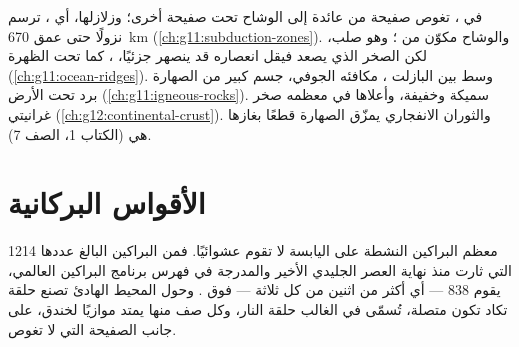 \begin{recall}
في ، تغوص صفيحة من  عائدة إلى
الوشاح تحت صفيحة أخرى؛ وزلازلها، أي ،
ترسم  نزولًا حتى عمق \qty{670}{km}
(\cref{ch:g11:subduction-zones}). والوشاح مكوّن من ؛ وهو
صلب، لكن الصخر الذي يصعد فيقل انعصاره قد ينصهر جزئيًا،
، كما تحت الظهرة (\cref{ch:g11:ocean-ridges}).
  وسط بين البازلت ،  مكافئه
الجوفي،  جسم كبير من الصهارة برد تحت الأرض
(\cref{ch:g11:igneous-rocks}).  سميكة وخفيفة،
وأعلاها في معظمه صخر غرانيتي (\cref{ch:g12:continental-crust}). والثوران
الانفجاري يمزّق الصهارة قطعًا بغازها هي (الكتاب 1، الصف 7).
\end{recall}

\section{الأقواس البركانية}

معظم البراكين النشطة على اليابسة لا تقوم عشوائيًا. فمن البراكين البالغ عددها 1214
التي ثارت منذ نهاية العصر الجليدي الأخير والمدرجة
في فهرس برنامج البراكين العالمي، يقوم 838 --- أي أكثر من اثنين من كل
ثلاثة --- فوق . وحول المحيط الهادئ تصنع حلقة
تكاد تكون متصلة، تُسمّى في الغالب حلقة النار، وكل صف منها
يمتد موازيًا لخندق، على جانب الصفيحة التي لا تغوص.

